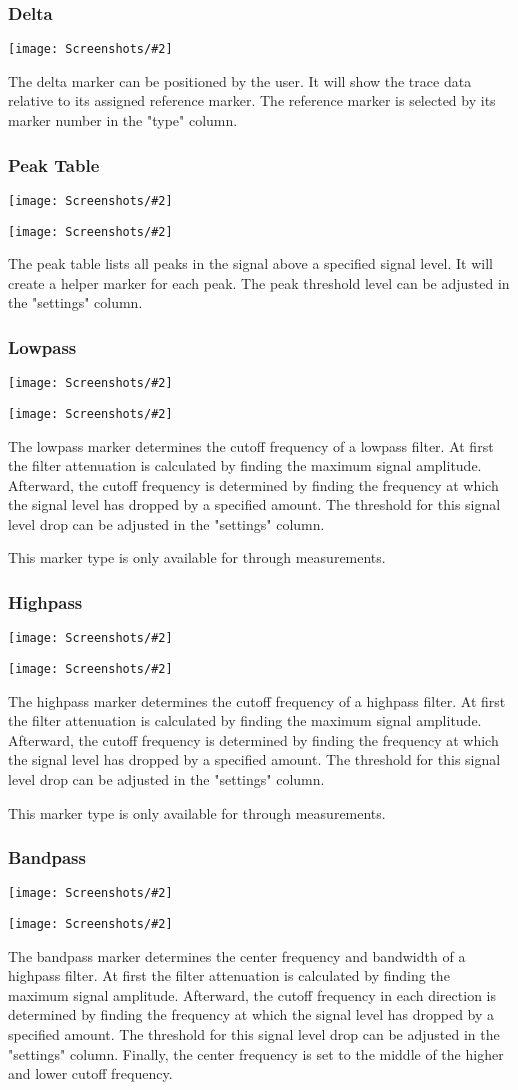 \documentclass[a4paper,11pt]{article}
\newcommand{\screenshot}[2]{\begin{center}
\texttt{[image: Screenshots/\#2]}
\end{center}}
\begin{document}
\subsubsection{Delta}
\screenshot{1.0}{MarkerDelta}
The delta marker can be positioned by the user. It will show the trace data relative to its assigned reference marker. The reference marker is selected by its marker number in the "type" column.
\subsubsection{Peak Table}
\screenshot{1.0}{MarkerPeakGraph.png}
\screenshot{1.0}{MarkerPeakTable.png}
The peak table lists all peaks in the signal above a specified signal level. It will create a helper marker for each peak. The peak threshold level can be adjusted in the "settings" column.
\subsubsection{Lowpass}
\screenshot{1.0}{MarkerLowpassGraph.png}
\screenshot{1.0}{MarkerLowpassTable.png}
The lowpass marker determines the cutoff frequency of a lowpass filter. At first the filter attenuation is calculated by finding the maximum signal amplitude. Afterward, the cutoff frequency is determined by finding the frequency at which the signal level has dropped by a specified amount. The threshold for this signal level drop can be adjusted in the "settings" column.

This marker type is only available for through measurements.
\subsubsection{Highpass}
\screenshot{1.0}{MarkerHighpassGraph.png}
\screenshot{1.0}{MarkerHighpassTable.png}
The highpass marker determines the cutoff frequency of a highpass filter. At first the filter attenuation is calculated by finding the maximum signal amplitude. Afterward, the cutoff frequency is determined by finding the frequency at which the signal level has dropped by a specified amount. The threshold for this signal level drop can be adjusted in the "settings" column.

This marker type is only available for through measurements.
\subsubsection{Bandpass}
\screenshot{1.0}{MarkerBandpassGraph.png}
\screenshot{1.0}{MarkerBandpassTable.png}
The bandpass marker determines the center frequency and bandwidth of a highpass filter. At first the filter attenuation is calculated by finding the maximum signal amplitude. Afterward, the cutoff frequency in each direction is determined by finding the frequency at which the signal level has dropped by a specified amount. The threshold for this signal level drop can be adjusted in the "settings" column. Finally, the center frequency is set to the middle of the higher and lower cutoff frequency.
\end{document}
